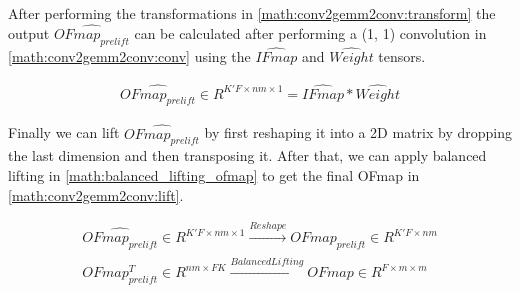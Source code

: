 After performing the transformations in \autoref{math:conv2gemm2conv:transform}
the output $\hat{OFmap_{prelift}}$ can be calculated after performing a (1, 1)
convolution in \autoref{math:conv2gemm2conv:conv} using the $\hat{IFmap}$ and
$\hat{Weight}$ tensors. 

\begin{equation}
    \begin{aligned}
        \hat{OFmap_{prelift}} \in R^{K'F\times nm \times 1} = \hat{IFmap}*\hat{Weight}
        \end{aligned}
    \label{math:conv2gemm2conv:conv}
\end{equation}

Finally we can lift $\hat{OFmap_{prelift}}$ by first reshaping it into a 2D
matrix by dropping the last dimension and then transposing it. After that, we
can apply balanced lifting in \autoref{math:balanced_lifting_ofmap} to get the
final OFmap in \autoref{math:conv2gemm2conv:lift}.

\begin{equation}
    \begin{aligned}
        \hat{OFmap_{prelift}} \in R^{K'F \times nm \times 1} \xrightarrow[]{Reshape} OFmap_{prelift} \in R^{K'F\times nm} \\
        OFmap_{prelift}^T \in R^{nm\times FK} \xrightarrow[]{Balanced Lifting} OFmap \in R^{F \times m \times m} \\
            \end{aligned}
    \label{math:conv2gemm2conv:lift}
\end{equation}


